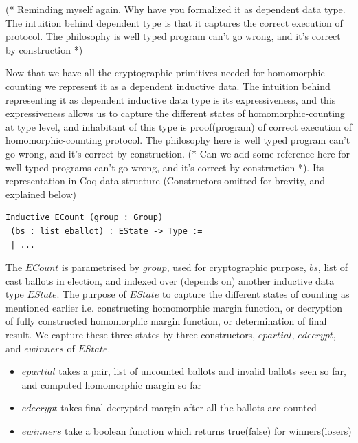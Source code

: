 \documentclass{llncs}
\begin{document}
 
 
(* Reminding myself again. Why have you formalized it as dependent data type. 
   The intuition behind dependent type is that it captures the 
   correct execution of protocol. The philosophy is well typed 
   program can't go wrong, and it's correct by construction *)
   
Now that we have all the cryptographic primitives needed for 
homomorphic-counting we represent it as a dependent inductive data. 
The intuition behind representing it as 
dependent inductive data type is its expressiveness, and this expressiveness 
 allows us to capture the  different states of 
homomorphic-counting at type level, and inhabitant of this type 
is proof(program) of correct execution of  homomorphic-counting protocol.
The philosophy here is well typed program can't go wrong, and it's 
correct by construction.
 (* Can we add some reference here 
for well typed programs can't go wrong, and it's correct by construction
   *). Its 
representation in Coq data structure (Constructors omitted for brevity, 
and explained below)
\begin{verbatim}
Inductive ECount (group : Group) 
 (bs : list eballot) : EState -> Type :=
 | ... 
\end{verbatim}
The $ECount$ is parametrised by $group$, used for cryptographic purpose, 
$bs$, list of cast ballots in election, and indexed over (depends on)
 another inductive data type $EState$.  The purpose of $EState$ to capture 
the different states 
of counting as mentioned earlier i.e. constructing homomorphic margin 
function, or decryption of fully constructed homomorphic margin function, or 
determination of final result. We capture these three states by 
 three constructors, $epartial$, $edecrypt$, and $ewinners$ of 
 $EState$.

\begin{itemize}
 \item $epartial$ takes a pair, list of uncounted ballots and invalid ballots seen 
       so far, and computed homomorphic margin so far
 \item $edecrypt$ takes final decrypted margin after all the ballots are counted
 \item $ewinners$ take a boolean function which returns true(false) for winners(losers)
\end{itemize}

\end{document}
